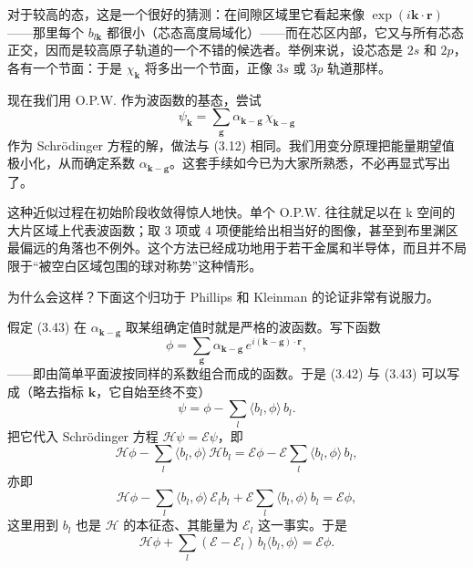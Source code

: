 对于较高的态，这是一个很好的猜测：在间隙区域里它看起来像 $\exp(i\mathbf{k}\cdot\mathbf{r})$——那里每个 $b_{l\mathbf{k}}$ 都很小（芯态高度局域化）——而在芯区内部，它又与所有芯态正交，因而是较高原子轨道的一个不错的候选者。举例来说，设芯态是 $2s$ 和 $2p$，各有一个节面：于是 $\chi_{\mathbf{k}}$ 将多出一个节面，正像 $3s$ 或 $3p$ 轨道那样。

现在我们用 O.P.W. 作为波函数的基态，尝试
\begin{equation*}
\psi_{\mathbf{k}}=\sum_{\mathbf{g}}\alpha_{\mathbf{k}-\mathbf{g}}\,\chi_{\mathbf{k}-\mathbf{g}}\tag{3.43}
\end{equation*}
作为 Schrödinger 方程的解，做法与 (3.12) 相同。我们用变分原理把能量期望值极小化，从而确定系数 $\alpha_{\mathbf{k}-\mathbf{g}}$。这套手续如今已为大家所熟悉，不必再显式写出了。

这种近似过程在初始阶段收敛得惊人地快。单个 O.P.W. 往往就足以在 k 空间的大片区域上代表波函数；取 3 项或 4 项便能给出相当好的图像，甚至到布里渊区最偏远的角落也不例外。这个方法已经成功地用于若干金属和半导体，而且并不局限于“被空白区域包围的球对称势”这种情形。

为什么会这样？下面这个归功于 Phillips 和 Kleinman 的论证非常有说服力。

假定 (3.43) 在 $\alpha_{\mathbf{k}-\mathbf{g}}$ 取某组确定值时就是严格的波函数。写下函数
\begin{equation*}
\phi=\sum_{\mathbf{g}}\alpha_{\mathbf{k}-\mathbf{g}}\,e^{i(\mathbf{k}-\mathbf{g})\cdot\mathbf{r}},\tag{3.44}
\end{equation*}
——即由简单平面波按同样的系数组合而成的函数。于是 (3.42) 与 (3.43) 可以写成（略去指标 $\mathbf{k}$，它自始至终不变）
\begin{equation*}
\psi=\phi-\sum_l\langle b_l,\phi\rangle\,b_l.\tag{3.45}
\end{equation*}
把它代入 Schrödinger 方程 $\mathcal{H}\psi=\mathcal{E}\psi$，即
\begin{equation*}
\mathcal{H}\phi-\sum_l\langle b_l,\phi\rangle\,\mathcal{H}b_l=\mathcal{E}\phi-\mathcal{E}\sum_l\langle b_l,\phi\rangle\,b_l,\tag{3.46}
\end{equation*}
亦即
\begin{equation*}
\mathcal{H}\phi-\sum_l\langle b_l,\phi\rangle\,\mathcal{E}_l b_l+\mathcal{E}\sum_l\langle b_l,\phi\rangle\,b_l=\mathcal{E}\phi,\tag{3.47}
\end{equation*}
这里用到 $b_l$ 也是 $\mathcal{H}$ 的本征态、其能量为 $\mathcal{E}_l$ 这一事实。于是
\begin{equation*}
\mathcal{H}\phi+\sum_l(\mathcal{E}-\mathcal{E}_l)\,b_l\langle b_l,\phi\rangle=\mathcal{E}\phi.\tag{3.48}
\end{equation*}

